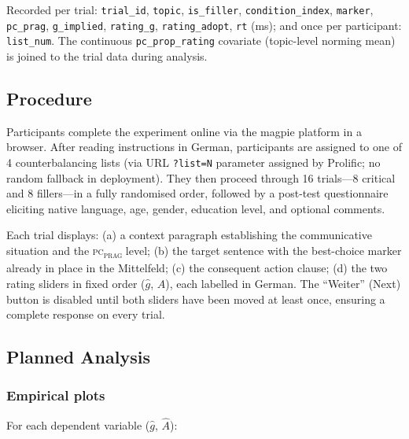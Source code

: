 \documentclass[12pt]{article}
\begin{document}
Recorded per trial: \texttt{trial\_id}, \texttt{topic},
\texttt{is\_filler}, \texttt{condition\_index}, \texttt{marker},
\texttt{pc\_prag}, \texttt{g\_implied}, \texttt{rating\_g},
\texttt{rating\_adopt}, \texttt{rt} (ms); and once per participant:
\texttt{list\_num}.
The continuous \texttt{pc\_prop\_rating} covariate (topic-level norming
mean) is joined to the trial data during analysis.

\subsection{Procedure}

Participants complete the experiment online via the magpie platform
\citep{kochetkova2024magpie} in a browser.
After reading instructions in German, participants are assigned to one of
4 counterbalancing lists (via URL \texttt{?list=N} parameter assigned by
Prolific; no random fallback in deployment).
They then proceed through 16 trials---8 critical and 8 fillers---in a
fully randomised order, followed by a post-test questionnaire eliciting
native language, age, gender, education level, and optional comments.

Each trial displays:
(a) a context paragraph establishing the communicative situation and the
\textsc{pc\textsubscript{prag}} level;
(b) the target sentence with the best-choice marker already in place in
the Mittelfeld;
(c) the consequent action clause;
(d) the two rating sliders in fixed order ($\widehat{g}$, $\widehat{A}$),
each labelled in German.
The ``Weiter'' (Next) button is disabled until both sliders have been
moved at least once, ensuring a complete response on every trial.

\subsection{Planned Analysis}

\subsubsection{Empirical plots}

For each dependent variable ($\widehat{g}$, $\widehat{A}$):
\end{document}
